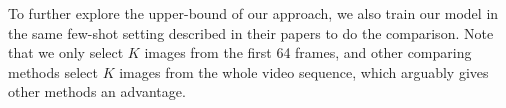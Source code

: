 \documentclass[runningheads]{llncs}
\begin{document}
To further explore the upper-bound of our approach, we also train our model in the same few-shot setting described in their papers to do the comparison. Note that we only select $K$ images from the first 64 frames, and other comparing methods select $K$ images from the whole video sequence, which arguably gives other methods an advantage.


\end{document}
